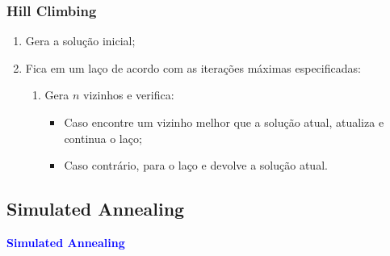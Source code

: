 \documentclass[compress, hide notes]{beamer}
\let\olditem=\item%
\renewcommand{\item}{\olditem \justifying}%
\begin{document}
 

 \begin{frame}
 \frametitle{Hill Climbing}
 
 \begin{enumerate}
 \item Gera a solução inicial;
 
 
 \bigskip
 \bigskip
 
 \item Fica em um laço de acordo com as iterações máximas especificadas: 
 
 \bigskip
 
 \begin{enumerate}
 \item Gera $n$ vizinhos e verifica:
 \begin{itemize}
 
 \bigskip
 
 \item Caso encontre um vizinho melhor que a solução atual, atualiza e continua o laço;
 
 \bigskip
 
 \item Caso contrário, para o laço e devolve a solução atual.
 \end{itemize}
 \end{enumerate}
 \end{enumerate}
 
 \end{frame}
 
 
 
 
 
 \subsection{Simulated Annealing}
 
 			\begin{frame}
				\centering
				{
					\Huge 
					\textcolor{blue}{\textbf{Simulated Annealing}}
				}
			\end{frame}
 
\end{document}
